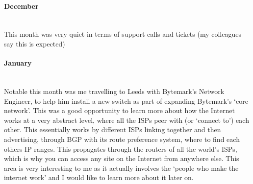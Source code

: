 \documentclass[12pt,a4paper]{article}
\newcommand{\paragraphnl}[1]{\paragraph{#1}\mbox{}\\}
\begin{document}
\paragraphnl{December}
	This month was very quiet in terms of support calls and tickets (my
	colleagues say this is expected)

\paragraphnl{January}
	Notable this month was me travelling to Leeds with Bytemark's Network
	Engineer, to help him install a new switch as part of expanding Bytemark's
	`core network'. This was a good opportunity to learn more about how the
	Internet works at a very abstract level, where all the ISPs peer with (or
	`connect to') each other. This essentially works by different ISPs linking
	together and then advertising, through BGP with its route preference system,
	where to find each others IP ranges. This propagates through the routers of
	all the world's ISPs, which is why you can access any site on the Internet
	from anywhere else. This area is very interesting to me as it actually
	involves the `people who make the internet work' and I would like to learn
	more about it later on.


\end{document}
